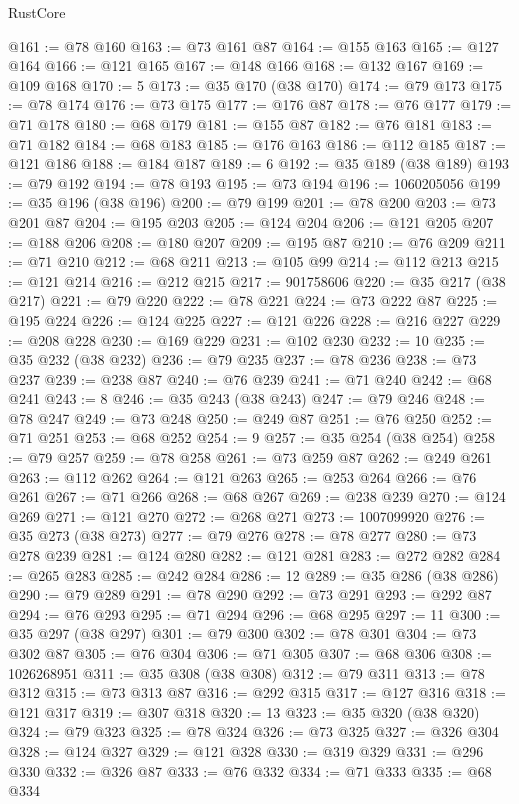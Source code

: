 \begin{lexlean}{RustCore}
\begin{coremodule}
@161 := @78 @160
@163 := @73 @161 @87
@164 := @155 @163
@165 := @127 @164
@166 := @121 @165
@167 := @148 @166
@168 := @132 @167
@169 := @109 @168
@170 := 5
@173 := @35 @170 (@38 @170)
@174 := @79 @173
@175 := @78 @174
@176 := @73 @175
@177 := @176 @87
@178 := @76 @177
@179 := @71 @178
@180 := @68 @179
@181 := @155 @87
@182 := @76 @181
@183 := @71 @182
@184 := @68 @183
@185 := @176 @163
@186 := @112 @185
@187 := @121 @186
@188 := @184 @187
@189 := 6
@192 := @35 @189 (@38 @189)
@193 := @79 @192
@194 := @78 @193
@195 := @73 @194
@196 := 1060205056
@199 := @35 @196 (@38 @196)
@200 := @79 @199
@201 := @78 @200
@203 := @73 @201 @87
@204 := @195 @203
@205 := @124 @204
@206 := @121 @205
@207 := @188 @206
@208 := @180 @207
@209 := @195 @87
@210 := @76 @209
@211 := @71 @210
@212 := @68 @211
@213 := @105 @99
@214 := @112 @213
@215 := @121 @214
@216 := @212 @215
@217 := 901758606
@220 := @35 @217 (@38 @217)
@221 := @79 @220
@222 := @78 @221
@224 := @73 @222 @87
@225 := @195 @224
@226 := @124 @225
@227 := @121 @226
@228 := @216 @227
@229 := @208 @228
@230 := @169 @229
@231 := @102 @230
@232 := 10
@235 := @35 @232 (@38 @232)
@236 := @79 @235
@237 := @78 @236
@238 := @73 @237
@239 := @238 @87
@240 := @76 @239
@241 := @71 @240
@242 := @68 @241
@243 := 8
@246 := @35 @243 (@38 @243)
@247 := @79 @246
@248 := @78 @247
@249 := @73 @248
@250 := @249 @87
@251 := @76 @250
@252 := @71 @251
@253 := @68 @252
@254 := 9
@257 := @35 @254 (@38 @254)
@258 := @79 @257
@259 := @78 @258
@261 := @73 @259 @87
@262 := @249 @261
@263 := @112 @262
@264 := @121 @263
@265 := @253 @264
@266 := @76 @261
@267 := @71 @266
@268 := @68 @267
@269 := @238 @239
@270 := @124 @269
@271 := @121 @270
@272 := @268 @271
@273 := 1007099920
@276 := @35 @273 (@38 @273)
@277 := @79 @276
@278 := @78 @277
@280 := @73 @278 @239
@281 := @124 @280
@282 := @121 @281
@283 := @272 @282
@284 := @265 @283
@285 := @242 @284
@286 := 12
@289 := @35 @286 (@38 @286)
@290 := @79 @289
@291 := @78 @290
@292 := @73 @291
@293 := @292 @87
@294 := @76 @293
@295 := @71 @294
@296 := @68 @295
@297 := 11
@300 := @35 @297 (@38 @297)
@301 := @79 @300
@302 := @78 @301
@304 := @73 @302 @87
@305 := @76 @304
@306 := @71 @305
@307 := @68 @306
@308 := 1026268951
@311 := @35 @308 (@38 @308)
@312 := @79 @311
@313 := @78 @312
@315 := @73 @313 @87
@316 := @292 @315
@317 := @127 @316
@318 := @121 @317
@319 := @307 @318
@320 := 13
@323 := @35 @320 (@38 @320)
@324 := @79 @323
@325 := @78 @324
@326 := @73 @325
@327 := @326 @304
@328 := @124 @327
@329 := @121 @328
@330 := @319 @329
@331 := @296 @330
@332 := @326 @87
@333 := @76 @332
@334 := @71 @333
@335 := @68 @334

\end{coremodule}
\end{lexlean}
